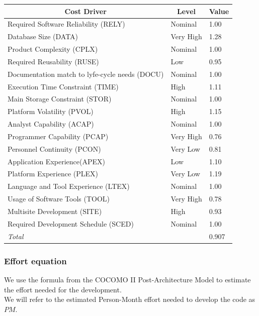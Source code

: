 \documentclass[english]{article}
\begin{document}
\begin{center}
	\begin{tabular}{|p{8cm}|p{2cm}|p{1cm}|}
		\hline
		\multicolumn{1}{|c|}{\textbf{Cost Driver}} & \multicolumn{1}{c|}{\textbf{Level}} & \multicolumn{1}{c|}{\textbf{Value}} \\
		\hline
		Required Software Reliability (RELY) & Nominal & 1.00 \\
		Database Size (DATA) & Very High & 1.28 \\
		Product Complexity (CPLX) & Nominal & 1.00 \\
		Required Reusability (RUSE) & Low & 0.95 \\
		Documentation match to lyfe-cycle needs (DOCU) & Nominal & 1.00 \\
		Execution Time Constraint (TIME) & High & 1.11 \\
		Main Storage Constraint (STOR) & Nominal & 1.00 \\
		Platform Volatility (PVOL) & High & 1.15 \\
		Analyst Capability (ACAP) & Nominal & 1.00 \\
		Programmer Capability (PCAP) & Very High & 0.76 \\
		Personnel Continuity (PCON) & Very Low & 0.81 \\
		Application Experience(APEX) & Low & 1.10 \\
		Platform Experience (PLEX) & Very Low & 1.19 \\
		Language and Tool Experience (LTEX) & Nominal & 1.00 \\
		Usage of Software Tools (TOOL) & Very High & 0.78 \\
		Multisite Development (SITE) & High & 0.93 \\
		Required Development Schedule (SCED) & Nominal & 1.00 \\
		\hline
		\multicolumn{2}{|l|}{\textit{Total}} & 0.907 \\
		\hline
	\end{tabular}
\end{center}

\newpage
\subsubsection{Effort equation}

We use the formula from the COCOMO II Post-Architecture Model to estimate the effort needed for the development.
\\We will refer to the estimated Person-Month effort needed to develop the code as $PM$.
\end{document}
